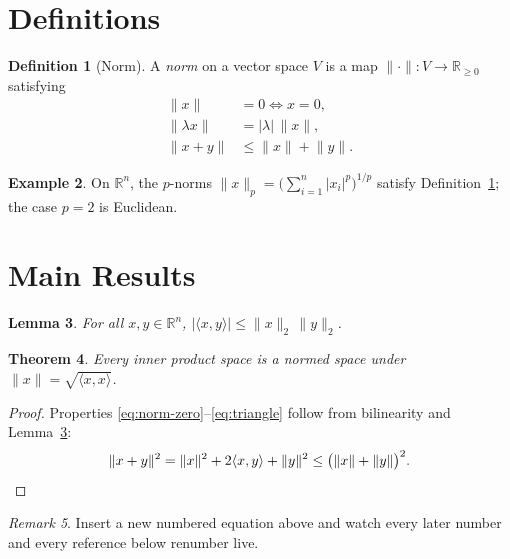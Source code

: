 \documentclass{article}
\newtheorem{theorem}{Theorem}[section]
\newtheorem{lemma}[theorem]{Lemma}
\theoremstyle{definition}
\newtheorem{definition}[theorem]{Definition}
\newtheorem{example}[theorem]{Example}
\theoremstyle{remark}
\newtheorem{remark}[theorem]{Remark}
\begin{document}
\tableofcontents

\section{Definitions}

\begin{definition}[Norm]
  \label{def:norm}
  A \emph{norm} on a vector space $V$ is a map
  $\lVert\cdot\rVert : V \to \mathbb{R}_{\ge 0}$ satisfying
  \begin{align}
    \lVert x \rVert &= 0 \iff x = 0, \label{eq:norm-zero}\\
    \lVert \lambda x \rVert &= |\lambda|\,\lVert x \rVert, \\
    \lVert x + y \rVert &\le \lVert x \rVert + \lVert y \rVert.
    \label{eq:triangle}
  \end{align}
\end{definition}

\begin{example}
  On $\mathbb{R}^n$, the $p$-norms
  $\lVert x \rVert_p = \bigl(\sum_{i=1}^n |x_i|^p\bigr)^{1/p}$
  satisfy Definition~\ref{def:norm}; the case $p=2$ is Euclidean.
\end{example}

\section{Main Results}

\begin{lemma}
  \label{lem:cs}
  For all $x, y \in \mathbb{R}^n$,
  $\bigl|\langle x, y\rangle\bigr| \le \lVert x\rVert_2\,\lVert y\rVert_2$.
\end{lemma}

\begin{theorem}
  \label{thm:main}
  Every inner product space is a normed space under
  $\lVert x \rVert = \sqrt{\langle x, x\rangle}$.
\end{theorem}

\begin{proof}
  Properties \eqref{eq:norm-zero}--\eqref{eq:triangle} follow from
  bilinearity and Lemma~\ref{lem:cs}:
  \[
    \lVert x+y \rVert^2
      = \lVert x\rVert^2 + 2\langle x,y\rangle + \lVert y\rVert^2
      \le \bigl(\lVert x\rVert + \lVert y\rVert\bigr)^2. \qedhere
  \]
\end{proof}

\begin{remark}
  Insert a new numbered equation above and watch every later number and
  every reference below renumber live.
\end{remark}
\end{document}
